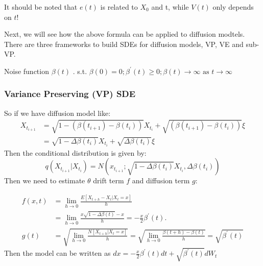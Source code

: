 It should be noted that $e(t)$ is related to $X_0$ and t, while $V(t)$ only depends on $t$!

Next, we will see how the above formula can be applied to diffusion modtels. There are three frameworks to build SDEs for diffusion models, VP, VE and sub-VP.
\begin{definition}
    Noise function  $\beta(t)$ . s.t. $\beta(0)=0 ; \beta^{\prime}(t) \geqslant 0 ; \beta(t) \rightarrow \infty \text { as } t \rightarrow \infty$
\end{definition}

\subsubsection*{Variance Preserving (VP) SDE}
So if we have diffusion model like:
\begin{equation}
\begin{aligned}
    X_{t_{i+1}}&=\sqrt{1-\left(\beta\left(t_{i+1}\right)-\beta\left(t_{i}\right)\right)}X_{t_i}+\sqrt{\left(\beta\left(t_{i+1}\right)-\beta\left(t_{i}\right)\right)}\xi\\
    &=\sqrt{1-\Delta\beta(t_i)}X_{t_i}+\sqrt{\Delta \beta(t_i)}\xi
\end{aligned}
\end{equation}
Then the conditional distribution is given by:
\begin{equation}
    q\left(X_{t_{i+1}} | X_{t_{i}}\right)=N(x_{t_{i+1}} ; \sqrt{1-\Delta \beta\left(t_{i}\right)}X_{t_i}, \Delta \beta\left(t_{i}\right))
\end{equation}
Then we need to estimate  $\theta$  drift term  $f$  and diffusion term  $g$:

\begin{equation}
    \begin{aligned}
        f(x, t)&=\lim _{h \rightarrow 0} \frac{E\left[X_{t+h}-X_{t} | X_{t}=x\right]}{h} \\
            &=\lim _{h \rightarrow 0} \frac{x \sqrt{1-\Delta \beta(t)}-x}{h}=-\frac{x}{2} \beta^{\prime}(t) . \\
    g(t) &= \sqrt{\lim _{h \rightarrow 0} \frac{N\left[X_{t+h} | X_{t}=x\right]}{h}}=\sqrt{\lim _{h \rightarrow 0} \frac{\beta(t+h)-\beta(t)}{h}}=\sqrt{\beta^{\prime}(t)}
    \end{aligned}
\end{equation}
Then the model can be written as
$d x=-\frac{x}{2} \beta^{\prime}(t) d t+\sqrt{\beta^{\prime}(t)} d W_{t}$


